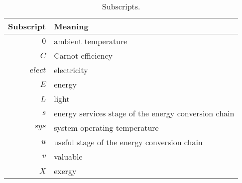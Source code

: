   
\begin{table}
\centering
\caption{Subscripts.}
\begin{tabular}{r l}
\toprule
Subscript & Meaning \\
\midrule
$0$ & ambient temperature \\
$C$ & Carnot efficiency \\
$elect$ & electricity \\
$E$ & energy \\
$L$ & light \\
$s$ & energy services stage of the energy conversion chain \\
$sys$ & system operating temperature \\
$u$ & useful stage of the energy conversion chain \\
$v$ & valuable \\
$X$ & exergy \\
\bottomrule
\end{tabular}
\label{tab:subscripts}
\end{table}


